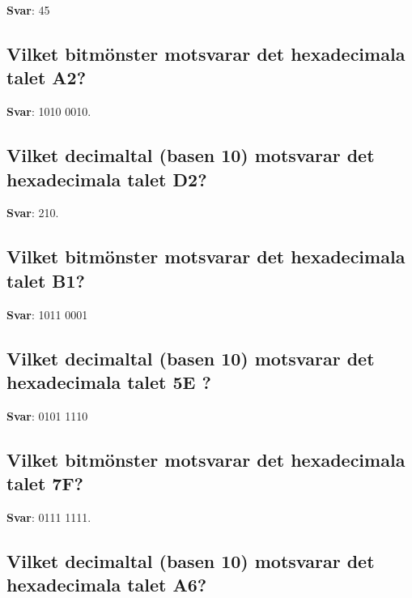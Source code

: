 \documentclass[a4paper,11pt,oneside]{article}
\begin{document}
\begin{sloppypar}
\label{q:395:sa:sv:True}

\textbf{Svar}: 45



\subsection{Vilket bitm\"onster motsvarar det hexadecimala talet A2?}

\label{q:396:sa:sv:True}

\textbf{Svar}: 1010 0010.



\subsection{Vilket decimaltal (basen 10) motsvarar det hexadecimala talet D2?}

\label{q:397:sa:sv:True}

\textbf{Svar}: 210.



\subsection{Vilket bitm\"onster motsvarar det hexadecimala talet B1?}

\label{q:398:sa:sv:True}

\textbf{Svar}: 1011 0001



\subsection{Vilket decimaltal (basen 10) motsvarar det hexadecimala talet 5E ?}

\label{q:399:sa:sv:True}

\textbf{Svar}: 0101 1110



\subsection{Vilket bitm\"onster motsvarar det hexadecimala talet 7F?}

\label{q:400:sa:sv:True}

\textbf{Svar}: 0111 1111.



\subsection{Vilket decimaltal (basen 10) motsvarar det hexadecimala talet A6?}


\end{sloppypar}
\end{document}
